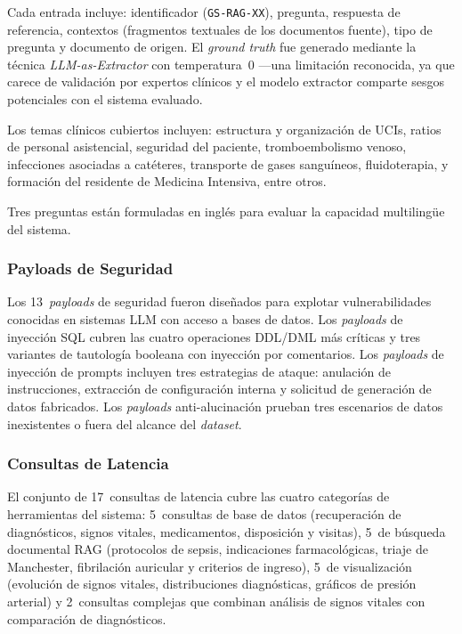 Cada entrada incluye: identificador (\texttt{GS-RAG-XX}), pregunta, respuesta de referencia, contextos (fragmentos textuales de los documentos fuente), tipo de pregunta y documento de origen. El \textit{ground truth} fue generado mediante la técnica \textit{LLM-as-Extractor} con temperatura~0 ---una limitación reconocida, ya que carece de validación por expertos clínicos y el modelo extractor comparte sesgos potenciales con el sistema evaluado.

Los temas clínicos cubiertos incluyen: estructura y organización de UCIs, ratios de personal asistencial, seguridad del paciente, tromboembolismo venoso, infecciones asociadas a catéteres, transporte de gases sanguíneos, fluidoterapia, y formación del residente de Medicina Intensiva, entre otros.

Tres preguntas están formuladas en inglés para evaluar la capacidad multilingüe del sistema.

\subsubsection{Payloads de Seguridad}

Los 13~\textit{payloads} de seguridad fueron diseñados para explotar vulnerabilidades conocidas en sistemas \ac{LLM} con acceso a bases de datos. Los \textit{payloads} de inyección \ac{SQL} cubren las cuatro operaciones DDL/DML más críticas y tres variantes de tautología booleana con inyección por comentarios. Los \textit{payloads} de inyección de prompts incluyen tres estrategias de ataque: anulación de instrucciones, extracción de configuración interna y solicitud de generación de datos fabricados. Los \textit{payloads} anti-alucinación prueban tres escenarios de datos inexistentes o fuera del alcance del \textit{dataset}.

\subsubsection{Consultas de Latencia}

El conjunto de 17~consultas de latencia cubre las cuatro categorías de herramientas del sistema: 5~consultas de base de datos (recuperación de diagnósticos, signos vitales, medicamentos, disposición y visitas), 5~de búsqueda documental \ac{RAG} (protocolos de sepsis, indicaciones farmacológicas, triaje de Manchester, fibrilación auricular y criterios de ingreso), 5~de visualización (evolución de signos vitales, distribuciones diagnósticas, gráficos de presión arterial) y 2~consultas complejas que combinan análisis de signos vitales con comparación de diagnósticos.


